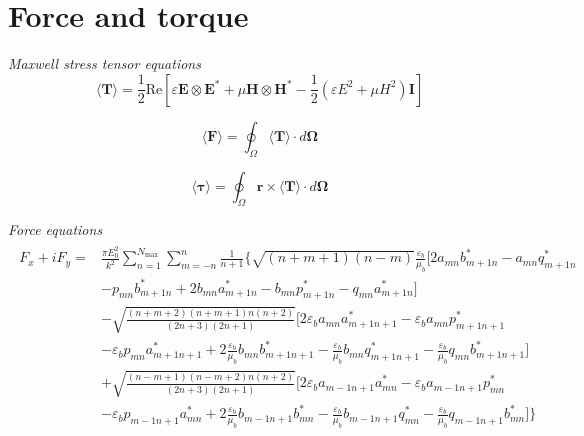 \documentclass[11pt]{article}
\begin{document}
\section{Force and torque}
\emph{Maxwell stress tensor equations}
\begin{equation}
    \langle \boldsymbol{T} \rangle = \frac{1}{2} \text{Re} \left[ \varepsilon  \boldsymbol{E} \otimes \boldsymbol{E^*} + \mu \boldsymbol{H} \otimes \boldsymbol{H^*}
    - \frac{1}{2}(\varepsilon E^2 + \mu H^2)\boldsymbol{I} \right]
\end{equation}

\begin{equation}
    \langle \boldsymbol{F} \rangle = \oint_\Omega \langle \boldsymbol{T} \rangle \cdot d \boldsymbol{\Omega}
\end{equation}

\begin{equation}
    \langle \boldsymbol{\tau} \rangle = \oint_\Omega \boldsymbol{r} \times \langle \boldsymbol{T}  \rangle \cdot d \boldsymbol{\Omega}
\end{equation}

\emph{Force equations}
\begin{align}
\begin{split}
    F_x + iF_y =& \frac{\pi E_0^2}{k^2} \sum_{n=1}^{N_\text{max}} \sum_{m=-n}^{n} \frac{1}{n+1}\bigg\{
          \sqrt{(n+m+1)(n-m)}\frac{\varepsilon_b}{\mu_b}
          \bigg[2a_{mn}b_{m+1n}^*  - a_{mn}q_{m+1n}^* \\ 
        & - p_{mn} b_{m+1n}^* + 2b_{mn}a_{m+1n}^* - b_{mn}p_{m+1n}^* - q_{mn}a_{m+1n}^*  \bigg] \\
        & - \sqrt{\frac{(n+m+2)(n+m+1)n(n+2)}{(2n+3)(2n+1)}}
        \bigg[ 2 \varepsilon_b a_{mn}a_{m+1n+1}^* - \varepsilon_b a_{mn}p_{m+1n+1}^* \\
        & - \varepsilon_b p_{mn}a_{m+1n+1}^* + 2 \frac{\varepsilon_b}{\mu_b} b_{mn}b_{m+1n+1}^* - \frac{\varepsilon_b}{\mu_b} b_{mn}q_{m+1n+1}^* - \frac{\varepsilon_b}{\mu_b} q_{mn}b_{m+1n+1}^*\bigg] \\
        & + \sqrt{\frac{(n-m+1)(n-m+2)n(n+2)}{(2n+3)(2n+1)}}
        \bigg[ 2 \varepsilon_b a_{m-1n+1}a_{mn}^* - \varepsilon_b a_{m-1n+1}p_{mn}^* \\
        & - \varepsilon_b p_{m-1n+1}a_{mn}^* + 2 \frac{\varepsilon_b}{\mu_b} b_{m-1n+1}b_{mn}^* - \frac{\varepsilon_b}{\mu_b} b_{m-1n+1}q_{mn}^* - \frac{\varepsilon_b}{\mu_b} q_{m-1n+1}b_{mn}^*\bigg]
        \bigg\}
\end{split}
\end{align}
\end{document}
